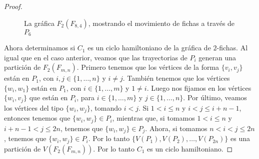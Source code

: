 \begin{proof}
\begin{figure}[ht!]
        \caption{La gr\'afica $F_2(F_{8,4})$, mostrando el movimiento de fichas
        a trav\'es de $P_6$ }
        \label{fig:exe-tray-n-2n}
    \end{figure}
    
    Ahora determinamos si $C_1$ es un ciclo hamiltoniano de la gr\'afica de
    $2$-fichas. Al igual que en el caso anterior, veamos que las trayectorias de
    $P_i$ generan una partici\'on de $F_2(F_{m,n})$. Primero tenemos que los
    v\'ertices de la forma $\{v_i,v_j\}$ est\'an en $P_1$, con $i,j \in \{1,
    \dots, n\}$ y $i \neq j$. Tambi\'en tenemos que los v\'ertices $\{w_i,w_1\}$
    est\'an en $P_1$, con $i \in \{1, \dots, m\}$ y $1 \neq i$. Luego nos
    fijamos en los v\'ertices $\{w_i,v_j\}$ que est\'an en $P_i$, para $i\in
    \{1, \dots, m\}$ y $j \in \{1, \dots, n\}$. Por \'ultimo, veamos los
    v\'ertices del tipo $\{w_i,w_j\}$, tomando $i < j$. Si $1 < i \leq n$ y $i <
    j \leq i+n-1$, entonces tenemos que $\{w_i,w_j\} \in P_i$, mientras que, si
    tomamos $1 < i \leq n$ y $i+n-1 < j \leq 2n$, tenemos que $\{w_i,w_j\} \in
    P_j$. Ahora, si tomamos $n<i<j \leq 2n$, tenemos que $\{w_i,w_j\} \in P_i$.
    Por lo tanto $\{V(P_1),V(P_2), \dots, V(P_{2n})\}$ es una partici\'on de
    $V(F_2(F_{m,n}))$. Por lo tanto $C_1$ es un ciclo hamiltoniano.


\end{proof}
